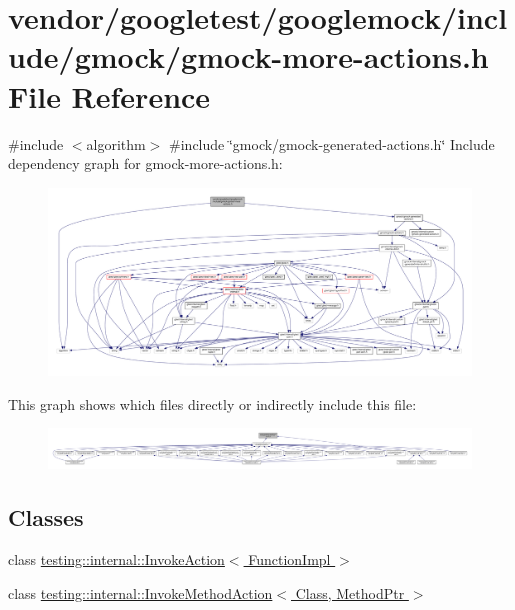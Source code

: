 \hypertarget{gmock-more-actions_8h}{}\section{vendor/googletest/googlemock/include/gmock/gmock-\/more-\/actions.h File Reference}
\label{gmock-more-actions_8h}
{\ttfamily \#include $<$algorithm$>$}\newline
{\ttfamily \#include \char`\"{}gmock/gmock-\/generated-\/actions.\+h\char`\"{}}\newline
Include dependency graph for gmock-\/more-\/actions.h\+:
\nopagebreak
\begin{figure}[H]
\begin{center}
\leavevmode
\includegraphics[width=350pt]{gmock-more-actions_8h__incl}
\end{center}
\end{figure}
This graph shows which files directly or indirectly include this file\+:
\nopagebreak
\begin{figure}[H]
\begin{center}
\leavevmode
\includegraphics[width=350pt]{gmock-more-actions_8h__dep__incl}
\end{center}
\end{figure}
\subsection*{Classes}
\begin{DoxyCompactItemize}
\item 
class \hyperlink{classtesting_1_1internal_1_1_invoke_action}{testing\+::internal\+::\+Invoke\+Action$<$ Function\+Impl $>$}
\item 
class \hyperlink{classtesting_1_1internal_1_1_invoke_method_action}{testing\+::internal\+::\+Invoke\+Method\+Action$<$ Class, Method\+Ptr $>$}
\end{DoxyCompactItemize}
